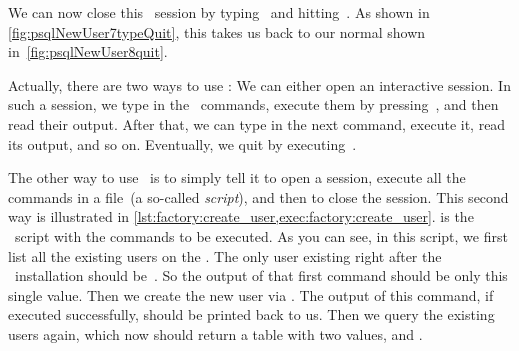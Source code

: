 We can now close this \psql\ session by typing~\sqlil{\\q} and hitting~\keys{\enter}.
As shown in \cref{fig:psqlNewUser7typeQuit}, this takes us back to our normal   shown in~\cref{fig:psqlNewUser8quit}.

Actually, there are two ways to use \psql:
We can either open an interactive session.
In such a session, we type in the \sql\ commands, execute them by pressing~\keys{\enter}, and then read their output.
After that, we can type in the next command, execute it, read its output, and so on.
Eventually, we quit by executing~\sqlil{\\q}.

The other way to use \psql\ is to simply tell it to open a session, execute all the commands in a file~(a so-called \emph{script}), and then to close the session.
This second way is illustrated in \cref{lst:factory:create_user,exec:factory:create_user}.
 is the \sql\ script with the commands to be executed.
As you can see, in this script, we first list all the existing users on the \dbms.
The only user existing right after the \postgresql\ installation should be~.
So the output of that first command should be only this single value.
Then we create the new user via .
The output of this command, if executed successfully, should be  printed back to us.
Then we query the existing users again, which now should return a table with two values,  and .
%
